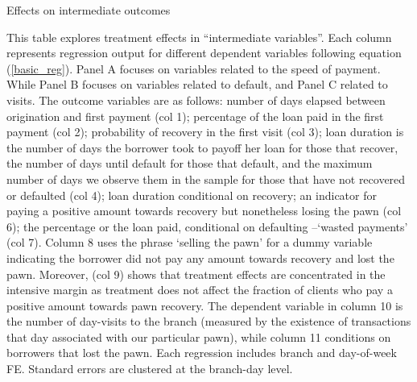 \documentclass[oneside,11pt]{article}
\begin{document}
\newpage
\begin{landscape}
\begin{table}[H]
\caption{Effects on intermediate outcomes}
\label{mechanisms}
\begin{center}
\resizebox{1.30\textwidth}{!}{
\scriptsize{}
}
\end{center}

\end{table}

\scriptsize {
\noindent This table explores treatment effects in ``intermediate variables''. Each column represents regression output for different dependent variables following equation (\ref{basic_reg}). Panel A focuses on variables related to the speed of payment. While Panel B focuses on variables related to default, and Panel C related to visits. The outcome variables are as follows:  number of days elapsed between origination and first payment (col 1); percentage of the loan paid in the first payment (col 2); probability of recovery in the first visit (col 3); loan duration is the number of days the borrower took to payoff her loan for those that recover, the number of days until default for those that default, and the maximum number of days we observe them in the sample for those that have not recovered or defaulted (col 4); loan duration conditional on recovery; an indicator for paying a positive amount towards recovery but nonetheless losing the pawn (col 6); the percentage or the loan paid, conditional on defaulting --`wasted payments' (col 7). Column 8 uses the phrase `selling the pawn' for a dummy variable indicating the borrower did not pay any amount towards recovery and lost the pawn. Moreover, (col 9) shows that treatment effects are concentrated in the intensive margin as treatment does not affect the fraction of clients who pay a positive amount towards pawn recovery. The dependent variable in column 10 is the number of day-visits to the branch (measured by the existence of transactions that day associated with our particular pawn), while column 11 conditions on borrowers that lost the pawn. Each regression includes branch and day-of-week FE. Standard errors are clustered at the branch-day level.}

\vspace{3ex}

\end{landscape}
\end{document}
